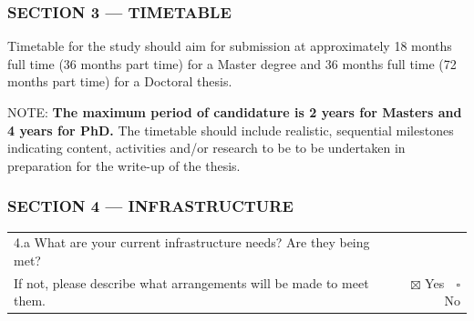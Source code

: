\documentclass[11pt,a4paper,oneside]{report}
\begin{document}
\clearpage
\subsubsection*{SECTION 3 --- TIMETABLE}
Timetable for the study should aim for submission at approximately 18 months full time (36 months part time) for a Master degree and 36 months full time (72 months part time) for a Doctoral thesis. 

NOTE:\textbf{ The maximum period of candidature is 2 years for Masters and 4 years for PhD.}
The timetable should include realistic, sequential milestones indicating content, activities and/or research to be to be undertaken in preparation for the write-up of the thesis.\par

\begin{mdframed}[everyline=true,splittopskip=20pt,splitbottomskip=20pt]

\noindent{}
\vspace{2ex}


\end{mdframed}

\subsubsection*{SECTION 4 --- INFRASTRUCTURE}
\begin{tabular}{ llll }
4.a What are your current infrastructure needs? Are they being met? \\ If not, please describe what arrangements will be made to meet them. & \multicolumn{3}{r}{ \hspace{3cm} $\boxtimes$ Yes $\;$ $\square$ No} \\
\end{tabular}
\end{document}

